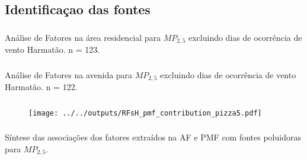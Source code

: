 \subsection{Identificaçao das fontes}



\begin{frame}
  \frametitle{}
  Análise de Fatores na área residencial para $MP_{2,5}$
               excluindo dias de ocorrência de vento Harmatão. n = 123.          
  \begin{table}[H]
    \centering
    \tiny
    
  \end{table}
\end{frame}

\begin{frame}
  \frametitle{}
Análise de Fatores na avenida para $MP_{2,5}$
           excluindo dias de ocorrência de vento Harmatão. n = 122.         
  \begin{table}[H]
    \centering
    \tiny
    
  \end{table}
\end{frame}



\begin{frame}
  \frametitle{}
    \begin{figure}
      \centering
            \begin{minipage}[b]{0.4\linewidth}
              \tiny
              
      
            \end{minipage}
                  \hspace{3cm}
      \begin{minipage}[b]{0.3\linewidth}
        \texttt{[image: ../../outputs/RFsH\_pmf\_contribution\_pizza5.pdf]}

      \end{minipage}%


    \end{figure}
\end{frame}


\begin{frame}
  \frametitle{}
  \begin{table}[H]
    \centering
    \tiny
    
    \caption{Síntese das associações dos fatores extraídos na AF e PMF com fontes 
             poluidoras para $MP_{2,5}$. \label{sintese_fino}}
  \end{table}
\end{frame}


\begin{frame}
  \frametitle{}
\end{frame}



\begin{frame}
  \frametitle{}
\end{frame}


\begin{frame}
  \frametitle{}
\end{frame}



\begin{frame}
  \frametitle{}
\end{frame}



